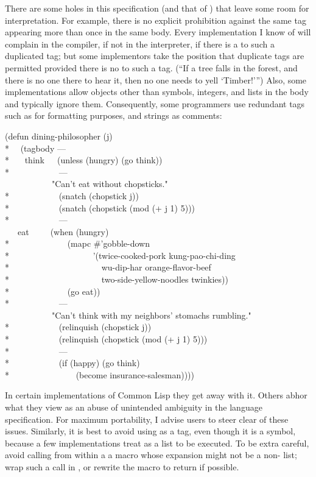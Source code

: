 \begin{defspec}
\begin{new}
There are some holes in this specification (and that of ) that
leave some room for interpretation.  For example, there is no explicit
prohibition against the same tag appearing more than once in the same
 body.  Every implementation I know of will complain
in the compiler, if not in the interpreter, if there is a  to
such a duplicated tag; but some implementors take the position
that duplicate tags are permitted provided there is no  to
such a tag.  (``If a tree falls in the forest, and there is no one
there to hear it, then no one needs to yell `Timber!'\thinspace'')
Also, some implementations allow objects other than symbols, integers,
and lists in the body and typically ignore them.
Consequently,
some programmers use redundant tags such as \cd{---} for formatting purposes,
and strings as comments:
\begin{lisp}
(defun dining-philosopher (j) \\*
~~(tagbody --- \\*
~~~think~~~(unless (hungry) (go think)) \\*
~~~~~~~~~~~--- \\
~~~~~~~~~~~"Can't eat without chopsticks." \\*
~~~~~~~~~~~(snatch (chopstick j)) \\*
~~~~~~~~~~~(snatch (chopstick (mod (+ j 1) 5))) \\*
~~~~~~~~~~~--- \\
~~~eat~~~~~(when (hungry) \\*
~~~~~~~~~~~~~(mapc \#'gobble-down \\*
~~~~~~~~~~~~~~~~~~~'(twice-cooked-pork kung-pao-chi-ding \\*
~~~~~~~~~~~~~~~~~~~~~wu-dip-har orange-flavor-beef \\*
~~~~~~~~~~~~~~~~~~~~~two-side-yellow-noodles twinkies)) \\*
~~~~~~~~~~~~~(go eat)) \\*
~~~~~~~~~~~--- \\
~~~~~~~~~~~"Can't think with my neighbors' stomachs rumbling." \\*
~~~~~~~~~~~(relinquish (chopstick j)) \\*
~~~~~~~~~~~(relinquish (chopstick (mod (+ j 1) 5))) \\*
~~~~~~~~~~~--- \\*
~~~~~~~~~~~(if (happy) (go think) \\*
~~~~~~~~~~~~~~~(become insurance-salesman))))
\end{lisp}
In certain implementations of Common Lisp they get away with it.
Others abhor what they view as an abuse of unintended ambiguity
in the language specification.  For maximum portability, I advise
users to steer clear of these issues.  Similarly, it is best
to avoid using  as a tag, even though it is a symbol, because
a few implementations treat  as a list to be executed.
To be extra careful, avoid calling from within a 
a macro whose expansion might not be a non- list; wrap such a 
call in , or rewrite the macro to return 
if possible.
\end{new}
\end{defspec}

